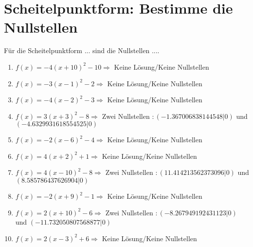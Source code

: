 \documentclass{article}%
\begin{document}
%
\section{Scheitelpunktform: Bestimme die Nullstellen}%
\label{sec:ScheitelpunktformBestimmedieNullstellen}%
Für die Scheitelpunktform ... sind die Nullstellen ....%
\begin{enumerate}[label=\alph*)]%
\item%
\newline\vspace{0.5cm}$f(x)=-4(x+10)^2 -10 \Rightarrow  $ Keine Lösung/Keine Nullstellen $ $%
\item%
\newline\vspace{0.5cm}$f(x)=-3(x-1)^2 -2 \Rightarrow  $ Keine Lösung/Keine Nullstellen $ $%
\item%
\newline\vspace{0.5cm}$f(x)=-4(x-2)^2 -3 \Rightarrow  $ Keine Lösung/Keine Nullstellen $ $%
\item%
\newline\vspace{0.5cm}$f(x)=3(x+3)^2 -8 \Rightarrow $ Zwei Nullstellen $: (-1.367006838144548|0) $ und $ (-4.6329931618554525|0) $%
\item%
\newline\vspace{0.5cm}$f(x)=-2(x-6)^2 -4 \Rightarrow  $ Keine Lösung/Keine Nullstellen $ $%
\item%
\newline\vspace{0.5cm}$f(x)=4(x+2)^2 +1 \Rightarrow  $ Keine Lösung/Keine Nullstellen $ $%
\item%
\newline\vspace{0.5cm}$f(x)=4(x-10)^2 -8 \Rightarrow $ Zwei Nullstellen $: (11.414213562373096|0) $ und $ (8.585786437626904|0) $%
\item%
\newline\vspace{0.5cm}$f(x)=-2(x+9)^2 -1 \Rightarrow  $ Keine Lösung/Keine Nullstellen $ $%
\item%
\newline\vspace{0.5cm}$f(x)=2(x+10)^2 -6 \Rightarrow $ Zwei Nullstellen $: (-8.267949192431123|0) $ und $ (-11.732050807568877|0) $%
\item%
\newline\vspace{0.5cm}$f(x)=2(x-3)^2 +6 \Rightarrow  $ Keine Lösung/Keine Nullstellen $ $%

\end{enumerate}
\end{document}

